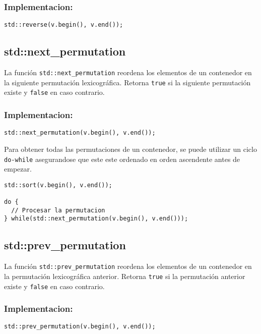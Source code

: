 \subsubsection{Implementacion:}
\begin{lstlisting}
std::reverse(v.begin(), v.end());
\end{lstlisting}

\subsection{std::next\_permutation}
\label{subsec:std_next_permutation}
La función \texttt{std::next\_permutation} reordena los elementos de un contenedor en la siguiente permutación lexicográfica. Retorna \texttt{true} si la siguiente permutación existe y \texttt{false} en caso contrario. 


\subsubsection{Implementacion:}
\begin{lstlisting}
std::next_permutation(v.begin(), v.end());
\end{lstlisting}


Para obtener todas las permutaciones de un contenedor, se puede utilizar un ciclo \texttt{do-while} asegurandose que este este ordenado en orden ascendente antes de empezar. 

\begin{lstlisting}
std::sort(v.begin(), v.end());

do {
  // Procesar la permutacion
} while(std::next_permutation(v.begin(), v.end()));
\end{lstlisting}

\subsection{std::prev\_permutation}
\label{subsec:std_prev_permutation}
La función \texttt{std::prev\_permutation} reordena los elementos de un contenedor en la permutación lexicográfica anterior. Retorna \texttt{true} si la permutación anterior existe y \texttt{false} en caso contrario. 

\subsubsection{Implementacion:}
\begin{lstlisting}
std::prev_permutation(v.begin(), v.end());
\end{lstlisting}

